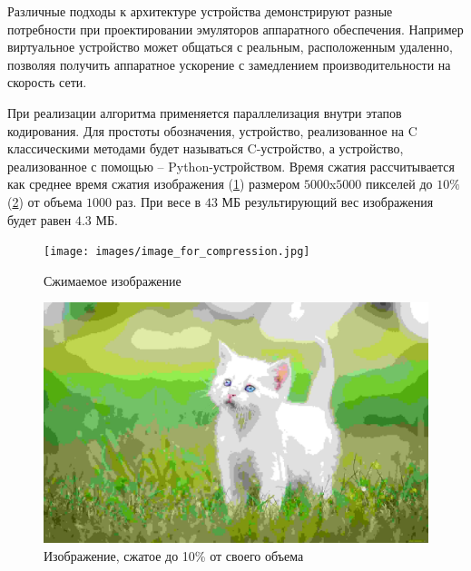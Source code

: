 Различные подходы к архитектуре устройства демонстрируют
разные потребности при проектировании эмуляторов аппаратного обеспечения.
Например виртуальное устройство может общаться с реальным, расположенным удаленно,
позволяя получить аппаратное ускорение с замедлением производительности на
скорость сети.

При реализации алгоритма применяется параллелизация внутри этапов кодирования.
Для простоты обозначения, устройство, реализованное на C классическими
методами будет называться C-устройство, а устройство, реализованное с помощью {\mylanguage} --
Python-устройством.
Время сжатия рассчитывается как среднее время сжатия изображения (\cref{fig:image-for-compression})
размером $5000$x$5000$ пикселей до $10\%$ (\cref{fig:image-after-compression}) от объема $1000$ раз.
При весе в $43$ МБ результирующий вес изображения будет равен $4.3$ МБ.


\begin{figure}[!htbp]
    \centering
    \begin{adjustbox}{max totalsize={0.8\textwidth}{\textheight}}
        \texttt{[image: images/image\_for\_compression.jpg]}
    \end{adjustbox}
    \caption{Сжимаемое изображение}\label{fig:image-for-compression}
\end{figure}

\begin{figure}[!htbp]
    \centering
    \begin{adjustbox}{max totalsize={0.8\textwidth}{\textheight}}
        \includegraphics{images/image_after_compression.jpg}
    \end{adjustbox}
    \caption{Изображение, сжатое до 10\% от своего объема}\label{fig:image-after-compression}
\end{figure}

